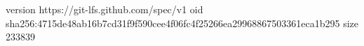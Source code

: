 version https://git-lfs.github.com/spec/v1
oid sha256:4715de48ab16b7cd31f9f590cee4f06fc4f25266ea29968867503361eca1b295
size 233839
